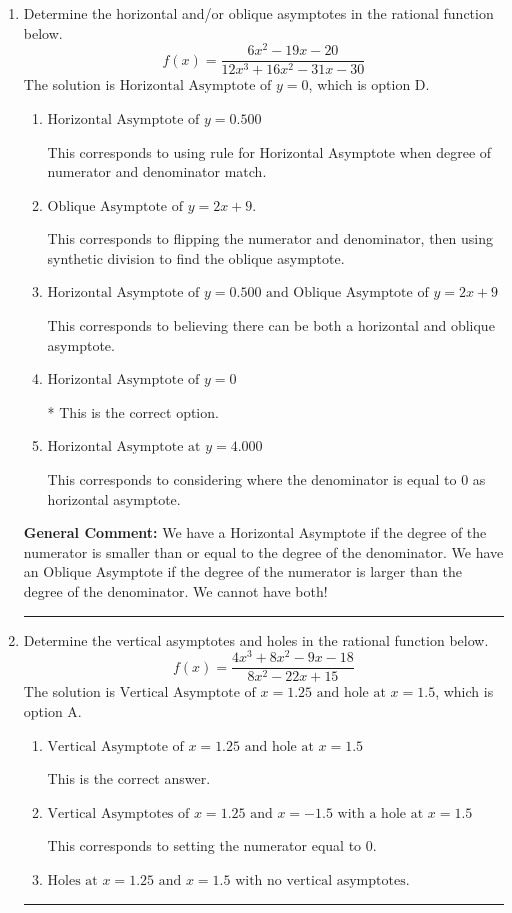 \documentclass{extbook}[14pt]
\newcommand{\litem}[1]{\item #1

\rule{\textwidth}{0.4pt}}
\begin{document}
\begin{enumerate}\litem{
Determine the horizontal and/or oblique asymptotes in the rational function below.
\[ f(x) = \frac{6x^{2} -19 x -20}{12x^{3} +16 x^{2} -31 x -30} \]The solution is \( \text{Horizontal Asymptote of } y = 0 \), which is option D.\begin{enumerate}[label=\Alph*.]
\item \( \text{Horizontal Asymptote of } y = 0.500  \)

This corresponds to using rule for Horizontal Asymptote when degree of numerator and denominator match.
\item \( \text{Oblique Asymptote of } y = 2x + 9. \)

This corresponds to flipping the numerator and denominator, then using synthetic division to find the oblique asymptote.
\item \( \text{Horizontal Asymptote of } y = 0.500 \text{ and Oblique Asymptote of } y = 2x + 9 \)

This corresponds to believing there can be both a horizontal and oblique asymptote.
\item \( \text{Horizontal Asymptote of } y = 0 \)

* This is the correct option.
\item \( \text{Horizontal Asymptote at } y = 4.000 \)

This corresponds to considering where the denominator is equal to 0 as horizontal asymptote.
\end{enumerate}

\textbf{General Comment:} We have a Horizontal Asymptote if the degree of the numerator is smaller than or equal to the degree of the denominator. We have an Oblique Asymptote if the degree of the numerator is larger than the degree of the denominator. We cannot have both!
}
\litem{
Determine the vertical asymptotes and holes in the rational function below.
\[ f(x) = \frac{4x^{3} +8 x^{2} -9 x -18}{8x^{2} -22 x + 15} \]The solution is \( \text{Vertical Asymptote of } x = 1.25 \text{ and hole at } x = 1.5 \), which is option A.\begin{enumerate}[label=\Alph*.]
\item \( \text{Vertical Asymptote of } x = 1.25 \text{ and hole at } x = 1.5 \)

This is the correct answer.
\item \( \text{Vertical Asymptotes of } x = 1.25 \text{ and } x = -1.5 \text{ with a hole at } x = 1.5 \)

This corresponds to setting the numerator equal to 0.
\item \( \text{Holes at } x = 1.25 \text{ and } x = 1.5 \text{ with no vertical asymptotes.} \)


\end{enumerate}}
\end{enumerate}
\end{document}

